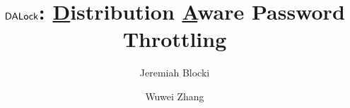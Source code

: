 \documentclass[sigconf]{acmart}
\author{Jeremiah Blocki}
\affiliation{%
	\institution{Purdue University}
}
\author{Wuwei Zhang}
\affiliation{%
	\institution{Purdue University}
}
\begin{document}
\title{$\mathsf{DALock}$:  \underline{D}istribution \underline{A}ware Password Throttling} 

\begin{abstract}
	
\end{abstract}


\begin{comment}
\begin{CCSXML}
<ccs2012>
<concept>
<concept_id>10002978.10003029.10011703</concept_id>
<concept_desc>Security and privacy~Usability in security and privacy</concept_desc>
<concept_significance>500</concept_significance>
</concept>
<concept>
<concept_id>10002978.10002991.10002992</concept_id>
<concept_desc>Security and privacy~Authentication</concept_desc>
<concept_significance>500</concept_significance>
</concept>
</ccs2012>
\end{CCSXML}

\ccsdesc[500]{Security and privacy~Usability in security and privacy}
\ccsdesc[500]{Security and privacy~Authentication}

\end{comment}



\maketitle

 
\newpage


\end{document}
